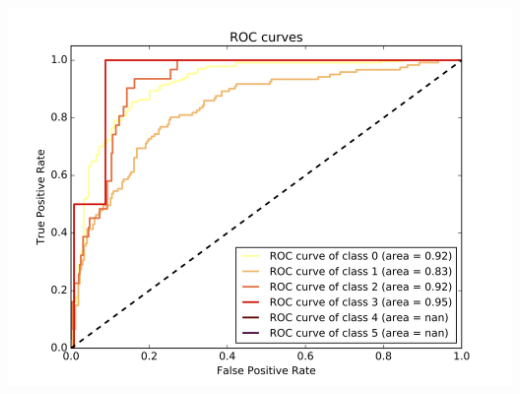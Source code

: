 \documentclass[c]{beamer}
\begin{document}
\begin{frame}
\begin{columns}
\begin{column}{0.6\textwidth}
       \centering\vfill
      \includegraphics[scale=0.18]{../../data/Pays-Bas/test/Neural_Network_Classification-oversampling/Neural_Network_Classification-oversampling_roc.png}
\end{column}
\end{columns}
\end{frame}
\end{document}
